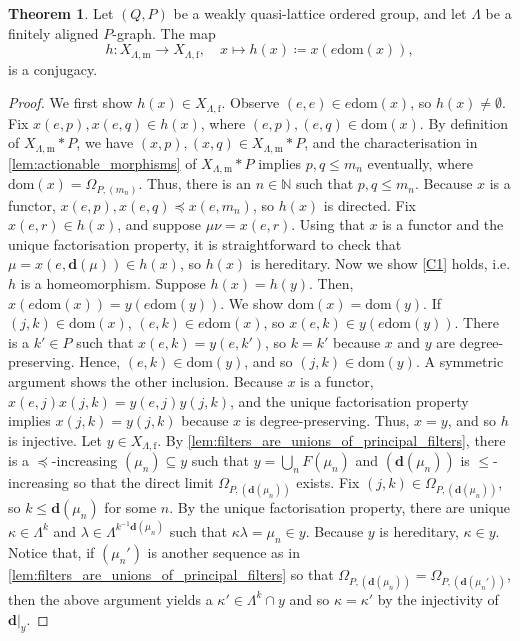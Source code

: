 \documentclass[11pt]{amsart}
\theoremstyle{definition}
\numberwithin{thm}{section}
\numberwithin{equation}{section}
\newtheorem{theorem}[thm]{Theorem}
\newcommand{\N}{\mathbb{N}}
\newcommand{\degree}{\mathbf{d}}
\newcommand{\morphdom}[1]{\mathrm{dom}(#1)}
\newcommand{\principal}[1]{F(#1)}
\newcommand{\M}{\mathrm{m}}
\newcommand{\F}{\mathrm{f}}
\newcommand{\PS}[2]{X_{#2, #1}}
\begin{document}
\begin{theorem}
\label{thm:conjugacy}
Let $(Q, P)$ be a weakly quasi-lattice ordered group, and let $\Lambda$ be a finitely aligned $P$-graph.
The map 
\[
h \colon \PS{\M}{\Lambda} \to \PS{\F}{\Lambda}, \quad 
x \mapsto h(x) \coloneqq x(e\morphdom{x}),
\]
is a conjugacy. 
\end{theorem}
\begin{proof}
We first show $h(x) \in \PS{\F}{\Lambda}$.
Observe $(e, e) \in e\morphdom{x}$, so $h(x) \neq \emptyset$.
Fix $x(e, p), x(e, q) \in h(x)$, where $(e, p), (e, q) \in \morphdom{x}$.
By definition of $\PS{\M}{\Lambda} * P$, we have $(x, p), (x, q) \in \PS{\M}{\Lambda} * P$, and the characterisation in \cref{lem:actionable_morphisms} of $\PS{\M}{\Lambda} * P$ implies $p, q \leq m_n$ eventually, where $\morphdom{x} = \Omega_{P, (m_n)}$. 
Thus, there is an $n \in \N$ such that $p, q \leq m_n$. 
Because $x$ is a functor, $x(e, p), x(e, q) \preceq x(e, m_n)$, so $h(x)$ is directed. 
Fix $x(e, r) \in h(x)$, and suppose $\mu\nu = x(e, r)$. 
Using that $x$ is a functor and the unique factorisation property, it is straightforward to check that $\mu = x(e, \degree(\mu)) \in h(x)$, so $h(x)$ is hereditary.
Now we show \ref{C1} holds, i.e. $h$ is a homeomorphism.
Suppose $h(x) = h(y)$.
Then, $x(e\morphdom{x}) = y(e\morphdom{y})$.
We show $\morphdom{x} = \morphdom{y}$.
If $(j, k) \in \morphdom{x}$, $(e, k) \in e\morphdom{x}$, so $x(e, k) \in y(e\morphdom{y})$. 
There is a $k' \in P$ such that $x(e, k) = y(e, k')$, so $k = k'$ because $x$ and $y$ are degree-preserving. 
Hence, $(e, k) \in \morphdom{y}$, and so $(j, k) \in \morphdom{y}$. 
A symmetric argument shows the other inclusion.
Because $x$ is a functor, $x(e, j)x(j, k) = y(e, j)y(j, k)$, and the unique factorisation property implies $x(j, k) = y(j, k)$ because $x$ is degree-preserving. 
Thus, $x = y$, and so $h$ is injective.
Let $y \in \PS{\F}{\Lambda}$.
By \cref{lem:filters_are_unions_of_principal_filters}, there is a $\preceq$-increasing $(\mu_n) \subseteq y$ such that $y = \bigcup_{n} \principal{\mu_n}$ and $(\degree(\mu_n))$ is $\leq$-increasing so that the direct limit $\Omega_{P, (\degree(\mu_n))}$ exists.
Fix $(j, k) \in \Omega_{P, (\degree(\mu_n))}$, so $k \leq \degree(\mu_n)$ for some $n$.
By the unique factorisation property, there are unique $\kappa \in \Lambda^k$ and $\lambda \in \Lambda^{k^{-1}\degree(\mu_n)}$ such that $\kappa\lambda = \mu_n \in y$. 
Because $y$ is hereditary, $\kappa \in y$.
Notice that, if $(\mu_n')$ is another sequence as in \cref{lem:filters_are_unions_of_principal_filters} so that $\Omega_{P, (\degree(\mu_n))} = \Omega_{P, (\degree(\mu_n'))}$, then the above argument yields a $\kappa' \in \Lambda^k \cap y$ and so $\kappa = \kappa'$ by the injectivity of $\degree|_y$. 

\end{proof}
\end{document}
